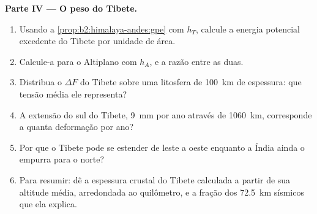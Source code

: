 \begin{problem}
\noindent\textbf{Parte IV --- O peso do Tibete.}
\begin{enumerate}[resume]
\item Usando a \cref{prop:b2:himalaya-andes:gpe} com $h_T$, calcule a energia potencial excedente
do Tibete por unidade de área.
\item Calcule-a para o Altiplano com $h_A$, e a razão entre as duas.
\item Distribua o $\Delta F$ do Tibete sobre uma litosfera de \qty{100}{km} de espessura: que tensão média
ele representa?
\item A extensão do sul do Tibete, \qty{9}{mm} por ano através de \qty{1060}{km}, corresponde a quanta
deformação por ano?
\item Por que o Tibete pode se estender de leste a oeste enquanto a Índia ainda o empurra para o norte?
\item Para resumir: dê a espessura crustal do Tibete calculada a partir de sua altitude média, arredondada
ao quilômetro, e a fração dos \qty{72.5}{km} sísmicos que ela explica.
\end{enumerate}
\end{problem}
